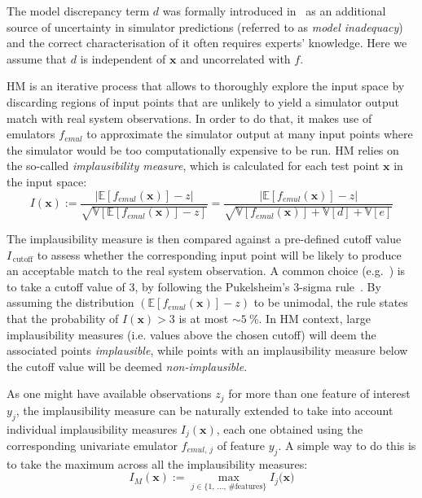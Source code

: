 \noindent
The model discrepancy term $d$ was formally introduced in~\cite{Kennedy:2001} as an additional source of uncertainty in simulator predictions (referred to as \textit{model inadequacy}) and the correct characterisation of it often requires experts' knowledge. Here we assume that $d$ is independent of $\mathbf{x}$ and uncorrelated with $f$.

\vspace{0.2cm}
HM is an iterative process that allows to thoroughly explore the input space by discarding regions of input points that are unlikely to yield a simulator output match with real system observations. In order to do that, it makes use of emulators $f_{emul}$ to approximate the simulator output at many input points where the simulator would be too computationally expensive to be run. HM relies on the so-called \textit{implausibility measure}, which is calculated for each test point $\mathbf{x}$ in the input space:
%
\begin{equation}\label{eq:implmeasure}
    I(\mathbf{x}) := \frac{\lvert\mathbb{E}[f_{emul}(\mathbf{x})]-z\rvert}{\sqrt{\mathbb{V}[\mathbb{E}[f_{emul}(\mathbf{x})]-z]}} = \frac{\lvert\mathbb{E}[f_{emul}(\mathbf{x})]-z\rvert}{\sqrt{\mathbb{V}[f_{emul}(\mathbf{x})] + \mathbb{V}[d] + \mathbb{V}[e]}}
\end{equation}

\noindent
The implausibility measure is then compared against a pre-defined cutoff value $I_{\,\text{cutoff}}$ to assess whether the corresponding input point will be likely to produce an acceptable match to the real system observation. A common choice (e.g.~\cite{Vernon:2010,Andrianakis:2015,Coveney:2018}) is to take a cutoff value of $3$, by following the Pukelsheim's $3$-sigma rule~\cite{Pukelsheim:1994}. By assuming the distribution $(\mathbb{E}[f_{emul}(\mathbf{x})]-z)$ to be unimodal, the rule states that the probability of $I(\mathbf{x})>3$ is at most $\sim\SI{5}{\percent}$. In HM context, large implausibility measures (i.e. values above the chosen cutoff) will deem the associated points \textit{implausible}, while points with an implausibility measure below the cutoff value will be deemed \textit{non-implausible}. 

\vspace{0.2cm}
As one might have available observations $z_j$ for more than one feature of interest $y_j$, the implausibility measure can be naturally extended to take into account individual implausibility measures $I_j(\mathbf{x})$, each one obtained using the corresponding univariate emulator $f_{emul,\,j}$ of feature $y_j$. A simple way to do this is to take the maximum across all the implausibility measures: 
%
\begin{equation}\label{eq:maximplmeasure}
    I_{M}(\mathbf{x}) := \max_{j\in\{1,\,\dots,\,\#\textrm{features}\}}{I_j(\mathbf{x}})
\end{equation}

